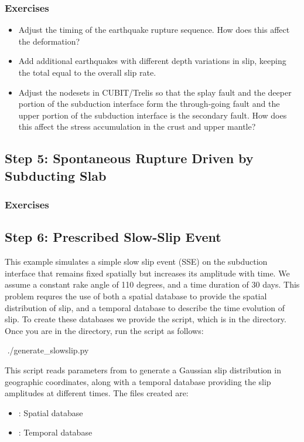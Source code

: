 \subsubsection{Exercises}

\begin{itemize}
  \item Adjust the timing of the earthquake rupture sequence. How does
    this affect the deformation?
  \item Add additional earthquakes with different depth variations in
    slip, keeping the total equal to the overall slip rate.
  \item Adjust the nodesets in CUBIT/Trelis so that the splay fault
    and the deeper portion of the subduction interface form the
    through-going fault and the upper portion of the subduction
    interface is the secondary fault. How does this affect the stress
    accumulation in the crust and upper mantle?
\end{itemize}

\subsection{Step 5: Spontaneous Rupture Driven by Subducting Slab}

\subsubsection{Exercises}

\subsection{Step 6: Prescribed Slow-Slip Event}

This example simulates a simple slow slip event (SSE) on the
subduction interface that remains fixed spatially but increases its
amplitude with time. We assume a constant rake angle of 110 degrees,
and a time duration of 30 days. This problem requres the use of both a
spatial database to provide the spatial distribution of slip, and a
temporal database to describe the time evolution of slip. To create
these databases we provide the 
script, which is in the  directory. Once you are
in the  directory, run the script as follows:
\begin{shell}
$$ ./generate_slowslip.py
\end{shell}
This script reads parameters from  to
generate a Gaussian slip distribution in geographic coordinates, along
with a temporal database providing the slip amplitudes at different
times. The files created are:
\begin{itemize}
\item {}: Spatial database
\item {}: Temporal database
\end{itemize}

